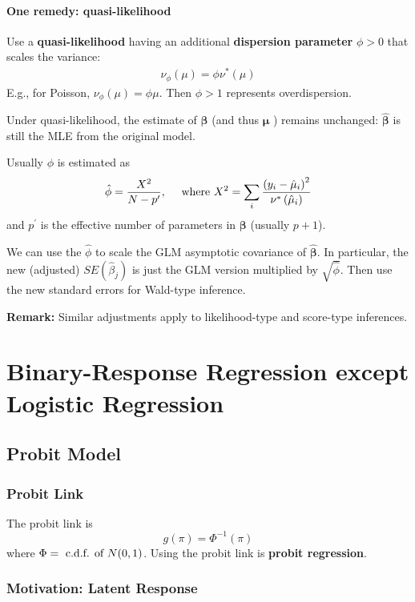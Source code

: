 \documentclass[11pt]{elegantbook}
\begin{document}
\subsubsection*{One remedy: quasi-likelihood}
Use a \textbf{quasi-likelihood} having an additional \textbf{dispersion parameter} $\phi>0$ that scales the variance:
\begin{equation}
    \begin{aligned}
        \nu_\phi(\mu)=\phi\nu^*(\mu)
    \end{aligned}
    \nonumber
\end{equation}
E.g., for Poisson, $\nu_\phi(\mu)=\phi\mu$. Then $\phi > 1$ represents overdispersion.

Under quasi-likelihood, the estimate of $\boldsymbol{\beta}$ (and thus $\boldsymbol{\mu}$ ) remains unchanged: $\hat{\boldsymbol{\beta}}$ is still the MLE from the original model.

Usually $\phi$ is estimated as
$$
\hat{\phi}=\frac{X^2}{N-p^{\prime}},\quad\textnormal{ where }
X^2=\sum_i \frac{\left(y_i-\hat{\mu}_i\right)^2}{\nu^*\left(\hat{\mu}_i\right)}
$$
and $p^{\prime}$ is the effective number of parameters in $\boldsymbol{\beta}$ (usually $p+1$).

We can use the $\hat{\phi}$ to scale the GLM asymptotic covariance of $\hat{\boldsymbol{\beta}}$. In particular, the new (adjusted) $S E\left(\hat{\beta}_j\right)$ is just the GLM version multiplied by $\sqrt{\hat{\phi}}$. Then use the new standard errors for Wald-type inference.

\textbf{Remark:} Similar adjustments apply to likelihood-type and score-type inferences.

\chapter{Binary-Response Regression except Logistic Regression}
\section{Probit Model}
\subsection{Probit Link}
The probit link is $$g(\pi)=\Phi^{-1}(\pi)$$ where $\Phi = \textnormal{ c.d.f. of }N(0,1)$. Using the probit link is \textbf{probit regression}.
\subsection{Motivation: Latent Response}
\end{document}
